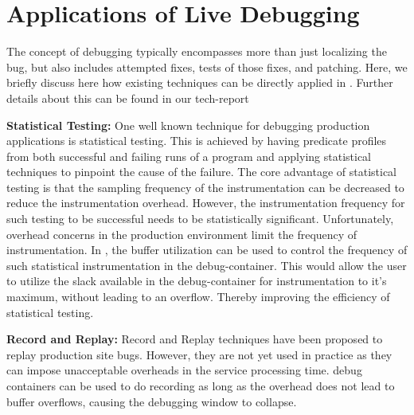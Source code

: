\vspace{-1mm}
\section{Applications of Live Debugging}
\label{sec:application}
The concept of debugging typically encompasses more than just localizing the bug, but also includes attempted fixes, tests of those fixes, and patching. 
Here, we briefly discuss here how existing techniques can be directly applied in \parikshan. 
Further details about this can be found in our tech-report~\cite{parikshanTR}

\noindent
\textbf{Statistical Testing:}
One well known technique for debugging production applications is statistical testing. 
This is achieved by having predicate profiles from both successful and failing runs of a program and applying statistical techniques to pinpoint the cause of the failure.
The core advantage of statistical testing is that the sampling frequency of the instrumentation can be decreased to reduce the instrumentation overhead.
However, the instrumentation frequency for such testing to be successful needs to be statistically significant. 
Unfortunately, overhead concerns in the production environment limit the frequency of instrumentation.
In \parikshan, the buffer utilization can be used to control the frequency of such statistical instrumentation in the debug-container. 
This would allow the user to utilize the slack available in the debug-container for instrumentation to it's maximum, without leading to an overflow. 
Thereby improving the efficiency of statistical testing.

\noindent
\textbf{Record and Replay:}
Record and Replay techniques have been proposed to replay production site bugs. 
However, they are not yet used in practice as they can impose unacceptable overheads in the service processing time.
\parikshan debug containers can be used to do recording as long as the overhead does not lead to buffer overflows, causing the debugging window to collapse.


